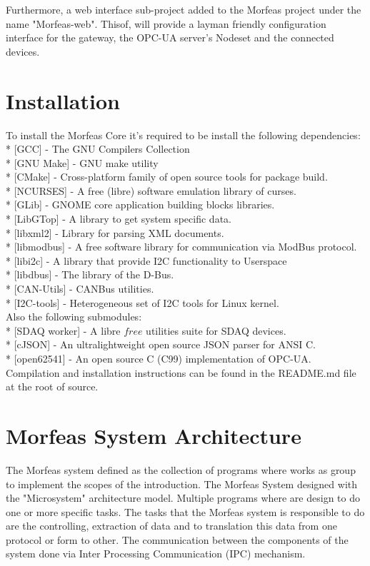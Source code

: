 \documentclass{article}
\begin{document}
Furthermore, a web interface sub-project added to the Morfeas project under the name "Morfeas-web".
Thisof, will provide a layman friendly configuration interface for the gateway, the OPC-UA server's Nodeset and the connected devices.

\section{Installation}
To install the Morfeas Core it's required to be install the following dependencies:\\
* [GCC] - The GNU Compilers Collection\\
* [GNU Make] - GNU make utility\\
* [CMake] - Cross-platform family of open source tools for package build.\\
* [NCURSES] - A free (libre) software emulation library of curses.\\
* [GLib] - GNOME core application building blocks libraries.\\
* [LibGTop] - A library to get system specific data.\\
* [libxml2] - Library for parsing XML documents.\\
* [libmodbus] - A free software library for communication via ModBus protocol.\\
* [libi2c] - A library that provide I2C functionality to Userspace\\
* [libdbus] - The library of the D-Bus.\\
* [CAN-Utils] - CANBus utilities.\\
* [I2C-tools] - Heterogeneous set of I2C tools for Linux kernel.\\
Also the following submodules:\\
* [SDAQ worker] - A libre \(free\) utilities suite for SDAQ devices.\\
* [cJSON] - An ultralightweight open source JSON parser for ANSI C.\\
* [open62541] - An open source C (C99) implementation of OPC-UA.\\

Compilation and installation instructions can be found in the README.md file at the root of source.

\section{Morfeas System Architecture}
The Morfeas system defined as the collection of programs where works as group to implement the scopes of the introduction.
The Morfeas System designed with the "Microsystem" architecture model. Multiple programs where are design to do one or more specific tasks.
The tasks that the Morfeas system is responsible to do are the controlling, extraction of data and to translation this data from one protocol or form to other.
The communication between the components of the system done via Inter Processing Communication (IPC) mechanism.
\end{document}
